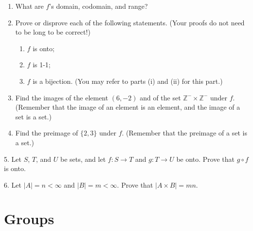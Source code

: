 \documentclass[10pt,openany,oneside]{book}
\theoremstyle{plain}
\theoremstyle{definition}
\theoremstyle{definition}
\theoremstyle{definition}
\theoremstyle{definition}
\numberwithin{equation}{section}
\def\Z{\mathbb{Z}}
\newcommand{\lt}{<}
\begin{document}
\begin{exerciselist}
\begin{enumerate}[label=(\alph*)]
\item\hypertarget{li-39}{}What are \(f\)'s domain, codomain, and range?%
\item\hypertarget{li-40}{}Prove or disprove each of the following statements. (Your proofs do not need to be long to be correct!) %
\begin{enumerate}[label=\roman*.]
\item\hypertarget{li-41}{}\(f\) is onto;%
\item\hypertarget{li-42}{}\(f\) is 1-1;%
\item\hypertarget{li-43}{}\(f\) is a bijection. (You may refer to parts (i) and (ii) for this part.)%
\end{enumerate}
%
\item\hypertarget{li-44}{}Find the images of the element \((6,-2)\) and of the set \(\Z^- \times \Z^-\) under \(f\). (Remember that the image of an element is an element, and the image of a set is a set.)%
\item\hypertarget{li-45}{}Find the preimage of \(\{2,3\}\) under \(f\). (Remember that the preimage of a set is a set.)%
\end{enumerate}
%
\par\smallskip
\item[5.]\hypertarget{exercise-5}{}Let \(S\), \(T\), and \(U\) be sets, and let \(f: S\to T\) and \(g: T\to U\) be onto. Prove that \(g \circ f\) is onto.%
\par\smallskip
\item[6.]\hypertarget{exercise-6}{}Let \(|A|=n\lt \infty\) and \(|B|=m\lt  \infty\). Prove that \(|A\times B|=mn\).%
\par\smallskip
\end{exerciselist}
\typeout{************************************************}
\typeout{************************************************}
\chapter[{Groups}]{Groups}\label{gps}
\typeout{************************************************}
\typeout{************************************************}
\end{document}

